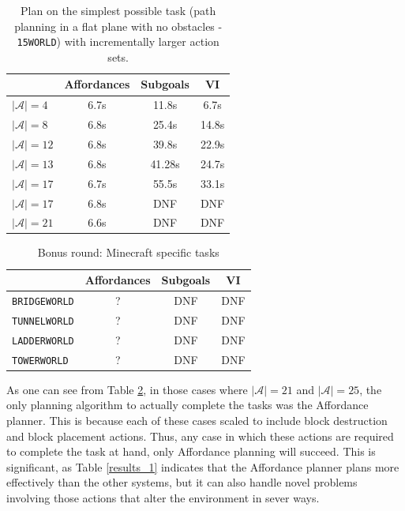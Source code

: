 \documentclass[]{article}
\begin{document}
\vspace{4 mm}

\begin{table}
\begin{tabular}{ l || c | c | c }
  & Affordances & Subgoals & VI \\
  \hline
  $|\mathcal{A}| = 4$ 		& 	6.7s 	& 	11.8s 	& 6.7s  \\ %
  $|\mathcal{A}| = 8$ 		& 	6.8s 	& 	25.4s 	& 14.8s  \\ %
  $|\mathcal{A}| = 12$ 	& 	6.8s 	& 	39.8s 	& 22.9s  \\ %
  $|\mathcal{A}| = 13$ 	& 	6.8s 	& 	41.28s      & 24.7s  \\ %
  $|\mathcal{A}| = 17$ 	& 	6.7s	& 	55.5s	& 33.1s  \\ %
  $|\mathcal{A}| = 17$ 	& 	6.8s 	& 	DNF 		& DNF  \\ %
  $|\mathcal{A}| = 21$ 	& 	6.6s 	& 	DNF 		& DNF  \\ %
\end{tabular}
\label{results_2}
\caption{Plan on the simplest possible task (path planning in a flat plane with no obstacles - \texttt{15WORLD}) with incrementally larger action sets.}
\end{table}

\vspace{4 mm}

\begin{table}
\begin{tabular}{ l || c | c | c }
  & Affordances & Subgoals & VI \\
  \hline
  \texttt{BRIDGEWORLD} 		& 	? 	& 	DNF 		& DNF  \\
  \texttt{TUNNELWORLD} 		& 	? 	& 	DNF 		& DNF  \\
  \texttt{LADDERWORLD} 	& 	? 	& 	DNF 		& DNF  \\
  \texttt{TOWERWORLD} 		& 	? 	& 	DNF 		& DNF  \\
\end{tabular}
\label{results_2}
\caption{Bonus round: Minecraft specific tasks}
\end{table}



As one can see from Table \ref{results_2}, in those cases where
$|\mathcal{A}| = 21$ and $|\mathcal{A}| = 25$, the only planning algorithm to
actually complete the tasks was the Affordance planner. This is because each
of these cases scaled to include block destruction and block placement actions.
Thus, any case in which these actions are required to complete the task at hand,
only Affordance planning will succeed. This is significant, as Table \ref{results_1}
indicates that the Affordance planner plans more effectively than the other
systems, but it can also handle novel problems involving those actions that
alter the environment in sever ways.
\end{document}
